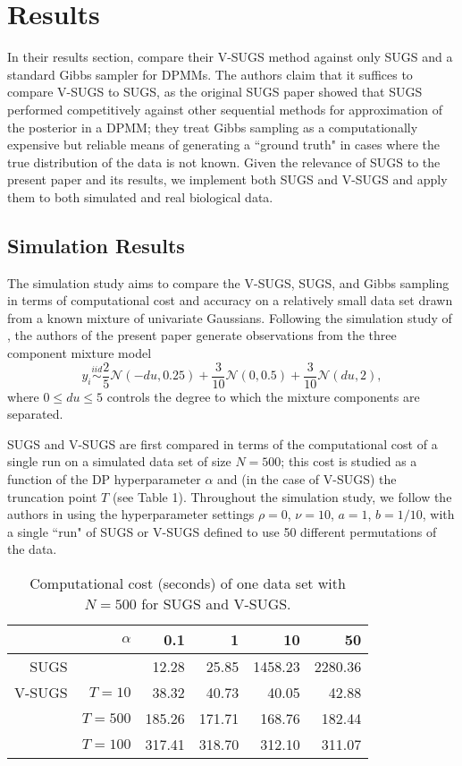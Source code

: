 \documentclass{uwstat572}
\begin{document}
\section{Results}

In their results section, \cite{zhang} compare their V-SUGS method against only SUGS and a standard Gibbs sampler for DPMMs. The authors claim that it suffices to compare V-SUGS to SUGS, as the original SUGS paper showed that SUGS performed competitively against other sequential methods for approximation of the posterior in a DPMM; they treat Gibbs sampling as a computationally expensive but reliable means of generating a ``ground truth" in cases where the true distribution of the data is not known. Given the relevance of SUGS to the present paper and its results, we implement both SUGS and V-SUGS and apply them to both simulated and real biological data. 

\subsection{Simulation Results}

The simulation study aims to compare the V-SUGS, SUGS, and Gibbs sampling in terms of computational cost and accuracy on a relatively small data set drawn from a known mixture of univariate Gaussians. Following the simulation study of \cite{wang}, the authors of the present paper generate observations from the three component mixture model
$$ y_i \overset{iid}\sim \frac{2}{5}\mathcal{N}(-du,0.25)+ \frac{3}{10}\mathcal{N}(0,0.5)+ \frac{3}{10}\mathcal{N}(du,2),$$
where $0 \leq du \leq 5$ controls the degree to which the mixture components are separated.

SUGS and V-SUGS are first compared in terms of the computational cost of a single run on a simulated data set of size $N = 500$; this cost is studied as a function of the DP hyperparameter $\alpha$ and (in the case of V-SUGS) the truncation point $T$ (see Table 1). Throughout the simulation study, we follow the authors in using the hyperparameter settings $\rho = 0$, $\nu = 10$, $a =1$, $b = 1/10$, with a single ``run" of SUGS or V-SUGS defined to use 50 different permutations of the data. 

\begin{table}[ht]
\centering
\begin{tabular}{rrrrrr}
  \hline \hline
 & $\alpha$ & 0.1 & 1 & 10 & 50 \\ 
  \hline
SUGS & & 12.28 & 25.85 & 1458.23 & 2280.36 \\ 
  V-SUGS & $T=10$& 38.32 & 40.73 & 40.05 & 42.88 \\ 
   & $T=500$& 185.26 & 171.71 & 168.76 & 182.44 \\ 
   & $T=100$& 317.41 &  318.70 & 312.10 & 311.07 \\ 
   \hline
\end{tabular}
\caption{\small Computational cost (seconds) of one data set with $N=500$ for SUGS and V-SUGS.}
\end{table}
\end{document}
